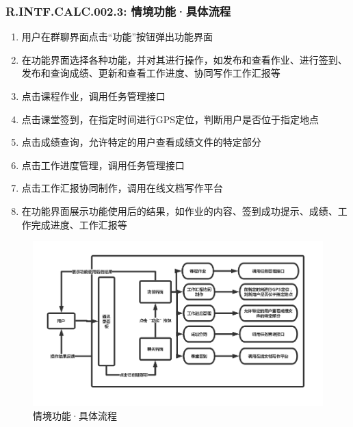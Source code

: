         \subsubsection{R.INTF.CALC.002.3: 情境功能·具体流程}
        \begin{enumerate}
            \item 用户在群聊界面点击“功能”按钮弹出功能界面
            \item 在功能界面选择各种功能，并对其进行操作，如发布和查看作业、进行签到、发布和查询成绩、更新和查看工作进度、协同写作工作汇报等
            \item 点击课程作业，调用任务管理接口
            \item 点击课堂签到，在指定时间进行GPS定位，判断用户是否位于指定地点
            \item 点击成绩查询，允许特定的用户查看成绩文件的特定部分
            \item 点击工作进度管理，调用任务管理接口
            \item 点击工作汇报协同制作，调用在线文档写作平台
            \item 在功能界面展示功能使用后的结果，如作业的内容、签到成功提示、成绩、工作完成进度、工作汇报等
        \end{enumerate}
        \begin{figure}[h]
            \centering
            \includegraphics[scale=0.4]{OutlineDesign/figures/情境功能·具体流程.png}
            \caption{情境功能·具体流程}
            \label{fig:server_flow}
        \end{figure}
